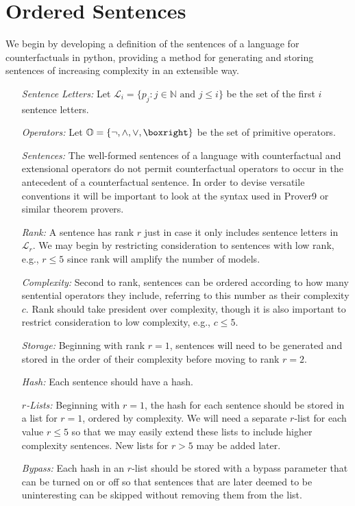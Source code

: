 \documentclass[a4paper, 11pt]{article} %
\newcommand{\set}[1]{\lbrace#1\rbrace} %
\renewcommand{\L}[0]{\mathcal{L}}
\newcommand{\N}[0]{\mathbb{N}}
\renewcommand{\O}[0]{\mathbb{O}}
\begin{document}
\section{Ordered Sentences}

We begin by developing a definition of the sentences of a language for counterfactuals in python, providing a method for generating and storing sentences of increasing complexity in an extensible way.

\begin{enumerate}
  \item[\it Sentence Letters:] Let $\L_i=\set{p_j:j\in\N \text{ and } j\leq i}$ be the set of the first $i$ sentence letters. 
  \item[\it Operators:] Let $\O=\set{\neg,\wedge,\vee,\boxright}$ be the set of primitive operators. 
  \item[\it Sentences:] The well-formed sentences of a language with counterfactual and extensional operators do not permit counterfactual operators to occur in the antecedent of a counterfactual sentence. In order to devise versatile conventions it will be important to look at the syntax used in Prover9 or similar theorem provers.
  \item[\it Rank:] A sentence has rank $r$ just in case it only includes sentence letters in $\L_r$. We may begin by restricting consideration to sentences with low rank, e.g., $r\leq5$ since rank will amplify the number of models.
  \item[\it Complexity:] Second to rank, sentences can be ordered according to how many sentential operators they include, referring to this number as their complexity $c$. Rank should take president over complexity, though it is also important to restrict consideration to low complexity, e.g., $c\leq5$.
  \item[\it Storage:] Beginning with rank $r=1$, sentences will need to be generated and stored in the order of their complexity before moving to rank $r=2$.
  \item[\it Hash:] Each sentence should have a hash.
  \item[\it $r$-Lists:] Beginning with $r=1$, the hash for each sentence should be stored in a list for $r=1$, ordered by complexity. We will need a separate $r$-list for each value $r\leq 5$ so that we may easily extend these lists to include higher complexity sentences. New lists for $r>5$ may be added later. 
  \item[\it Bypass:] Each hash in an $r$-list should be stored with a bypass parameter that can be turned on or off so that sentences that are later deemed to be uninteresting can be skipped without removing them from the list.

\end{enumerate}
\end{document}
